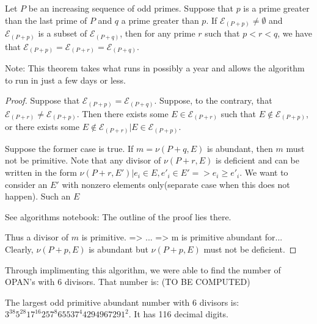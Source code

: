 \documentclass[../paper.tex]{subfiles}
\begin{document}
\begin{theorem} 
Let $P$ be an increasing sequence of odd primes. Suppose
that $p$ is a prime greater than the last prime of $P$ and $q$ a
prime greater than $p$. If $\mathcal{E}_{(P + p)} \neq 
\emptyset$ and $\mathcal{E}_{(P + p)}$ is a subset of 
$\mathcal{E}_{(P + q)}$, then for any prime $r$ such that $p <
r < q$, we have that $\mathcal{E}_{(P + p)} = \mathcal{E}_{(P +
r)} = \mathcal{E}_{(P + q)}$.
\end{theorem}

Note: This theorem takes what runs in possibly a year and allows
the algorithm to run in just a few days or less.

\begin{proof}
Suppose that $\mathcal{E}_{(P + p)} = \mathcal{E}_{(P + q)}$.
Suppose, to the contrary, that $\mathcal{E}_{(P+r)} \neq
\mathcal{E}_{(P + p)}$. Then there exists some $E \in
\mathcal{E}_{(P + r)}$ such that $E \notin \mathcal{E}_{(P + p)}$, or there
exists some $E \notin \mathcal{E}_{(P + r)} | E \in \mathcal{E}_{(P +
p)}$. 

Suppose the former case is true. If $m = \nu(P + q, E)$ is abundant,
then $m$ must not be primitive. Note that any divisor of $\nu(P +
r, E)$ is deficient and can be written in the form $\nu(P + r, E')
| e_i \in E, e'_i \in E' => e_i \geq e'_i$. We want to consider
an $E'$ with nonzero elements only(separate case when this does
not happen). Such an $E$ 

See algorithms notebook: The outline of the proof lies there.

Thus a divisor of $m$ is
primitive. => ... => m is primitive abundant for...
Clearly, $\nu(P + p, E)$ is
abundant but $\nu(P + p, E)$ must not be deficient. 

\end{proof}

Through implimenting this algorithm, we were able to find the
number of OPAN's with 6 divisors. That number is: (TO BE COMPUTED)


The largest odd primitive abundant number with 6 divisors is:
$3^{38} 5^{28} 17^{16} 257^8 65537^4 4294967291^2$. It has 116 decimal
digits.
\end{document}
